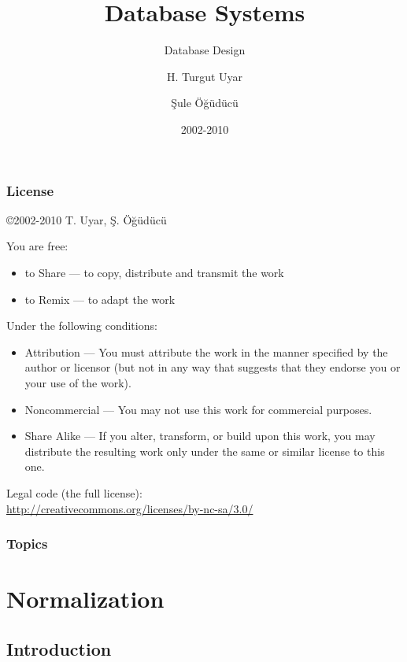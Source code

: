 \documentclass[dvipsnames]{beamer}
\title{Database Systems}
\subtitle{Database Design}
\author{H. Turgut Uyar \and Şule Öğüdücü}
\date{2002-2010}
\begin{document}
\begin{frame}
  \titlepage
\end{frame}

\begin{frame}
  \frametitle{License}

  \hfill
  \copyright 2002-2010 T. Uyar, Ş. Öğüdücü

  \vfill
  \begin{tiny}
    You are free:
    \begin{itemize}
      \item to Share — to copy, distribute and transmit the work
      \item to Remix — to adapt the work
    \end{itemize}

    Under the following conditions:
    \begin{itemize}
      \item Attribution — You must attribute the work in the manner specified by
        the author or licensor (but not in any way that suggests that they
        endorse you or your use of the work).

      \item Noncommercial — You may not use this work for commercial purposes.

      \item Share Alike — If you alter, transform, or build upon this work, you
        may distribute the resulting work only under the same or similar license
        to this one.
    \end{itemize}
  \end{tiny}

  \vfill
  Legal code (the full license):\\
  \url{http://creativecommons.org/licenses/by-nc-sa/3.0/}
\end{frame}

\begin{frame}
  \frametitle{Topics}
  \tableofcontents
\end{frame}

\section{Normalization}

\subsection{Introduction}
\end{document}
